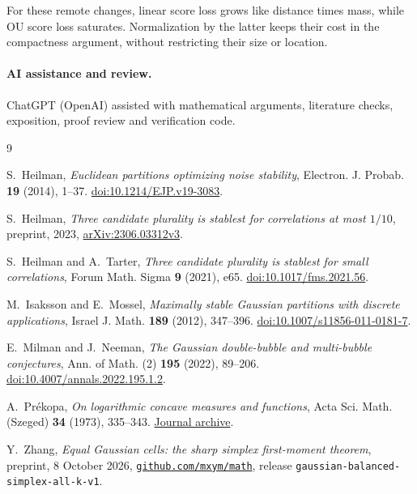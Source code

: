 \documentclass[11pt,reqno]{amsart}
\begin{document}
For these remote changes, linear score loss grows like distance times
mass, while OU score loss saturates. Normalization by the latter keeps
their cost in the compactness argument, without restricting their size
or location.

\paragraph{AI assistance and review.}
ChatGPT (OpenAI) assisted with mathematical arguments, literature checks,
exposition, proof review and verification code.

\begin{thebibliography}{9}
\raggedright
{}
S.~Heilman, \emph{Euclidean partitions optimizing noise stability},
Electron. J. Probab. \textbf{19} (2014), 1--37.
\href{https://doi.org/10.1214/EJP.v19-3083}{doi:10.1214/EJP.v19-3083}.

S.~Heilman, \emph{Three candidate plurality is stablest for correlations
at most $1/10$}, preprint, 2023,
\href{https://arxiv.org/abs/2306.03312v3}{arXiv:2306.03312v3}.

S.~Heilman and A.~Tarter,
\emph{Three candidate plurality is stablest for small correlations},
Forum Math. Sigma \textbf{9} (2021), e65.
\href{https://doi.org/10.1017/fms.2021.56}{doi:10.1017/fms.2021.56}.

M.~Isaksson and E.~Mossel, \emph{Maximally stable Gaussian partitions
with discrete applications}, Israel J. Math. \textbf{189} (2012), 347--396.
\href{https://doi.org/10.1007/s11856-011-0181-7}{doi:10.1007/s11856-011-0181-7}.

E.~Milman and J.~Neeman,
\emph{The Gaussian double-bubble and multi-bubble conjectures},
Ann. of Math. (2) \textbf{195} (2022), 89--206.
\href{https://doi.org/10.4007/annals.2022.195.1.2}{doi:10.4007/annals.2022.195.1.2}.

A.~Pr\'ekopa, \emph{On logarithmic concave measures and functions},
Acta Sci. Math. (Szeged) \textbf{34} (1973), 335--343.
\href{https://acta.bibl.u-szeged.hu/14411/}{Journal archive}.

Y.~Zhang, \emph{Equal Gaussian cells: the sharp simplex first-moment
theorem}, preprint, 8 October 2026,
\href{https://github.com/mxym/math/releases/tag/gaussian-balanced-simplex-all-k-v1}
{\texttt{github.com/mxym/math}}, release \texttt{gaussian-balanced-simplex-all-k-v1}.
\end{thebibliography}
\end{document}
